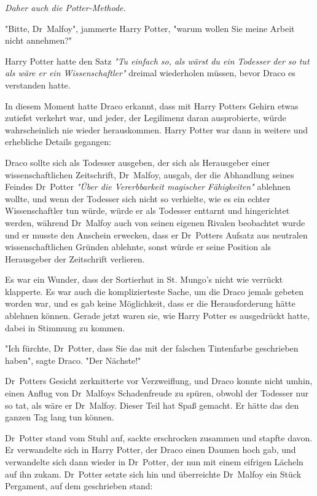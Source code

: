 {\emph{Daher auch die Potter-Methode.}

"Bitte, Dr~Malfoy", jammerte Harry Potter, "warum wollen Sie meine Arbeit nicht annehmen?"

Harry Potter hatte den Satz \emph{"Tu einfach so, als wärst du ein Todesser der so tut als wäre er ein Wissenschaftler"} dreimal wiederholen müssen, bevor Draco es verstanden hatte.

In diesem Moment hatte Draco erkannt, dass mit Harry Potters Gehirn etwas zutiefst verkehrt war, und jeder, der Legilimenz daran ausprobierte, würde wahrscheinlich nie wieder herauskommen. Harry Potter war dann in weitere und erhebliche Details gegangen:

Draco sollte sich als Todesser ausgeben, der sich als Herausgeber einer wissenschaftlichen Zeitschrift, Dr~Malfoy, ausgab, der die Abhandlung seines Feindes Dr~Potter \emph{"Über die Vererbbarkeit magischer Fähigkeiten"} ablehnen wollte, und wenn der Todesser sich nicht so verhielte, wie es ein echter Wissenschaftler tun würde, würde er als Todesser enttarnt und hingerichtet werden, während Dr~Malfoy auch von seinen eigenen Rivalen beobachtet wurde und er musste den Anschein erwecken, dass er Dr~Potters Aufsatz aus neutralen wissenschaftlichen Gründen ablehnte, sonst würde er seine Position als Herausgeber der Zeitschrift verlieren.

Es war ein Wunder, dass der Sortierhut in St. Mungo's nicht wie verrückt klapperte. Es war auch die komplizierteste Sache, um die Draco jemals gebeten worden war, und es gab keine Möglichkeit, dass er die Herausforderung hätte ablehnen können. Gerade jetzt waren sie, wie Harry Potter es ausgedrückt hatte, dabei in Stimmung zu kommen.

"Ich fürchte, Dr~Potter, dass Sie das mit der falschen Tintenfarbe geschrieben haben", sagte Draco. "Der Nächste!"

Dr~Potters Gesicht zerknitterte vor Verzweiflung, und Draco konnte nicht umhin, einen Anflug von Dr~Malfoys Schadenfreude zu spüren, obwohl der Todesser nur so tat, als wäre er Dr~Malfoy. Dieser Teil hat Spaß gemacht. Er hätte das den ganzen Tag lang tun können.

Dr~Potter stand vom Stuhl auf, sackte erschrocken zusammen und stapfte davon. Er verwandelte sich in Harry Potter, der Draco einen Daumen hoch gab, und verwandelte sich dann wieder in Dr~Potter, der nun mit einem eifrigen Lächeln auf ihn zukam. Dr~Potter setzte sich hin und überreichte Dr~Malfoy ein Stück Pergament, auf dem geschrieben stand:

}
